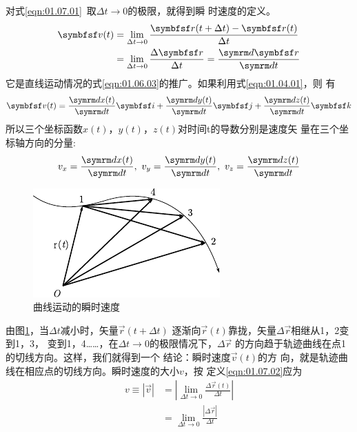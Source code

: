 对式\eqref{eqn:01.07.01}~取$\Delta t \rightarrow 0$的极限，就得到瞬
时速度的定义。
\begin{equation}\label{eqn:01.07.02}
    \begin{aligned}
        \vec{v}(t) & =\lim _{\Delta t \rightarrow 0} \frac{\vec{r}(t+\Delta t)-\vec{r}(t)}{\Delta t} \\
                  & =\lim _{\Delta t \rightarrow 0} \frac{\Delta \vec{r}}{\Delta t} =\frac{\dif\vec{r}}{\dif t}
    \end{aligned}
\end{equation}
它是直线运动情况的式\eqref{eqn:01.06.03}的推广。如果利用式\eqref{eqn:01.04.01}，则
有
\begin{equation}\label{eqn:01.07.03}
    \vec{v}(t)=\frac{\dif x(t)}{\dif t} \vec{i}+\frac{\dif y(t)}{\dif t} \vec{j}+\frac{\dif z(t)}{\dif t} \vec{k}
\end{equation}
所以三个坐标函数$x(t)$，$y(t)$，$z(t)$对时间t的导数分别是速度矢
量在三个坐标轴方向的分量:
\begin{equation}\label{eqn:01.07.04}
    v_{x}=\frac{\dif x(t)}{\dif t}, ~ v_{y}=\frac{\dif y(t)}{\dif t}, ~ v_{z}=\frac{\dif z(t)}{\dif t}
\end{equation}
\clearpage
\begin{figure}
    \centering
    \small
    \includegraphics{figure/fig01.12}
    \caption{曲线运动的瞬时速度}
    \label{fig:01.12}
\end{figure}
由图\ref{fig:01.12}，当$\Delta t$减小时，矢量$\vec{r}(t+\Delta t)$
逐渐向$\vec{r}(t)$靠拢，矢量$\Delta \vec{r}$相继从1，2变到1，3，
变到1，4……，在$\Delta t \rightarrow 0$的极限情况下，$\Delta \vec{r}$
的方向趋于轨迹曲线在点1的切线方向。这样，我们就得到一个
结论：瞬时速度$\vec{v}(t)$的方
向，就是轨迹曲线在相应点的切线方向。瞬时速度的大小$v$，按
定义\eqref{eqn:01.07.02}应为
\setlength{\mathindent}{15em}
\begin{equation*}
    \begin{aligned}
        v\equiv |\vec{v}| & =\left|\lim _{\Delta t \rightarrow 0} \frac{\Delta \vec{r}(t)}{\Delta t}\right| \\
                         & =\lim _{\Delta t \rightarrow 0} \frac{|\Delta \vec{r}|}{\Delta t}
    \end{aligned}
\end{equation*}

